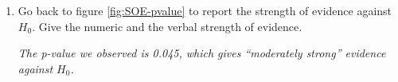 \begin{enumerate}
     \item  Go back to figure \ref{fig:SOE-pvalue} to report the
       strength of evidence against $H_0$.  Give the numeric and the
       verbal strength of evidence.  
\begin{students}
  \vspace{1.2cm}
\end{students}
\begin{key}
{\it The p-value we observed is 0.045, which gives ``moderately
  strong'' evidence against $H_0$. }
\end{key}
\\
\end{enumerate}






